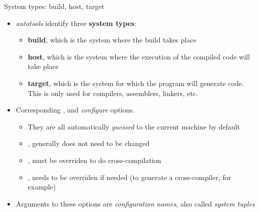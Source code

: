 \begin{frame}{System types: build, host, target}
  \begin{itemize}
  \item {\em autotools} identify three {\bf system types}:
    \begin{itemize}
    \item {\bf build}, which is the system where the build takes place
    \item {\bf host}, which is the system where the execution of the
      compiled code will take place
    \item {\bf target}, which is the system for which the program will
      generate code. This is only used for compilers, assemblers,
      linkers, etc.
    \end{itemize}
  \item Corresponding ,  and
     {\em configure} options.
    \begin{itemize}
    \item They are all automatically {\em guessed} to the current
      machine by default
    \item {}, generally does not need to be changed
    \item {}, must be overriden to do cross-compilation
    \item {}, needs to be overriden if needed (to
      generate a cross-compiler, for example)
    \end{itemize}
  \item Arguments to these options are {\em configuration names}, also
    called {\em system tuples}
  \end{itemize}
\end{frame}

